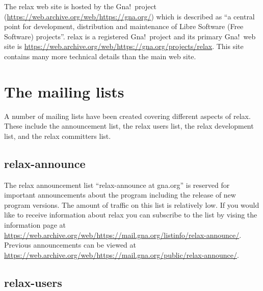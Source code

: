 The relax web site is hosted by the Gna!\ project (\href{https://web.archive.org/web/https://gna.org/}{https://web.archive.org/web/https://gna.org/}) which is described as ``a central point for development, distribution and maintenance of Libre Software (Free Software) projects''.
relax is a registered Gna!\ project and its primary Gna!\ web site is \href{https://web.archive.org/web/https://gna.org/projects/relax}{https://web.archive.org/web/https://gna.org/projects/relax}.
This site contains many more technical details than the main web site.




\section{The mailing lists}

A number of mailing lists have been created covering different aspects of relax.
These include the announcement list, the relax users list, the relax development list, and the relax committers list.


\subsection{relax-announce}

The relax announcement list ``relax-announce at gna.org'' is reserved for important announcements about the program including the release of new program versions.
The amount of traffic on this list is relatively low.
If you would like to receive information about relax you can subscribe to the list by vising the information page at \href{https://web.archive.org/web/https://mail.gna.org/listinfo/relax-announce/}{https://web.archive.org/web/https://mail.gna.org/listinfo/relax-announce/}.
Previous announcements can be viewed at \href{https://web.archive.org/web/https://mail.gna.org/public/relax-announce/}{https://web.archive.org/web/https://mail.gna.org/public/relax-announce/}.


\subsection{relax-users} \label{sect: relax-users mailing list}

